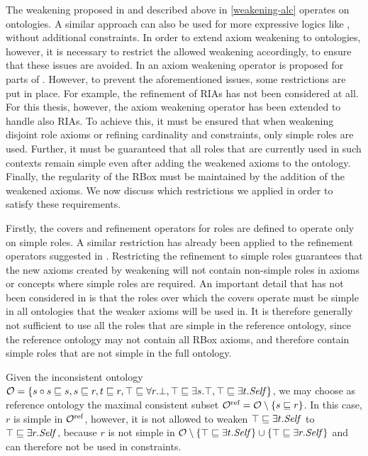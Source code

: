 The weakening proposed in \cite{troquard2018repairing} and described above in \cref{weakening-alc} operates on \ALC ontologies. A similar approach can also be used for more expressive logics like \ALCHOIQ, without additional constraints. In order to extend axiom weakening to \SROIQ ontologies, however, it is necessary to restrict the allowed weakening accordingly, to ensure that these issues are avoided. In \cite{confalonieri2020towards} an axiom weakening operator is proposed for parts of \SROIQ. However, to prevent the aforementioned issues, some restrictions are put in place. For example, the refinement of RIAs has not been considered at all. For this thesis, however, the axiom weakening operator has been extended to handle also RIAs. To achieve this, it must be ensured that when weakening disjoint role axioms or refining cardinality and \self constraints, only simple roles are used. Further, it must be guaranteed that all roles that are currently used in such contexts remain simple even after adding the weakened axioms to the ontology. Finally, the regularity of the RBox must be maintained by the addition of the weakened axioms. We now discuss which restrictions we applied in order to satisfy these requirements.

Firstly, the covers and refinement operators for roles are defined to operate only on simple roles. A similar restriction has already been applied to the refinement operators suggested in \cite{confalonieri2020towards}. Restricting the refinement to simple roles guarantees that the new axioms created by weakening will not contain non-simple roles in axioms or concepts where simple roles are required. An important detail that has not been considered in \cite{confalonieri2020towards} is that the roles over which the covers operate must be simple in all ontologies that the weaker axioms will be used in. It is therefore generally not sufficient to use all the roles that are simple in the reference ontology, since the reference ontology may not contain all RBox axioms, and therefore contain simple roles that are not simple in the full ontology.

\begin{example}
  Given the inconsistent ontology $\mathcal{O} = \{ s \circ s \sqsubseteq s, s \sqsubseteq r, t \sqsubseteq r, \top \sqsubseteq \forall r.\bot, \top \sqsubseteq \exists s.\top, \top \sqsubseteq \exists t.\mathit{Self} \}$, we may choose as reference ontology the maximal consistent subset ${\mathcal{O}^\textnormal{ref}} = \mathcal{O} \setminus \{ s \sqsubseteq r \}$. In this case, $r$ is simple in ${\mathcal{O}^\textnormal{ref}}$, however, it is not allowed to weaken $\top \sqsubseteq \exists t.\mathit{Self}$ to $\top \sqsubseteq \exists r.\mathit{Self}$, because $r$ is not simple in $\mathcal{O} \setminus \{ \top \sqsubseteq \exists t.\mathit{Self} \} \cup \{ \top \sqsubseteq \exists r.\mathit{Self} \}$ and can therefore not be used in \self constraints.
\end{example}

